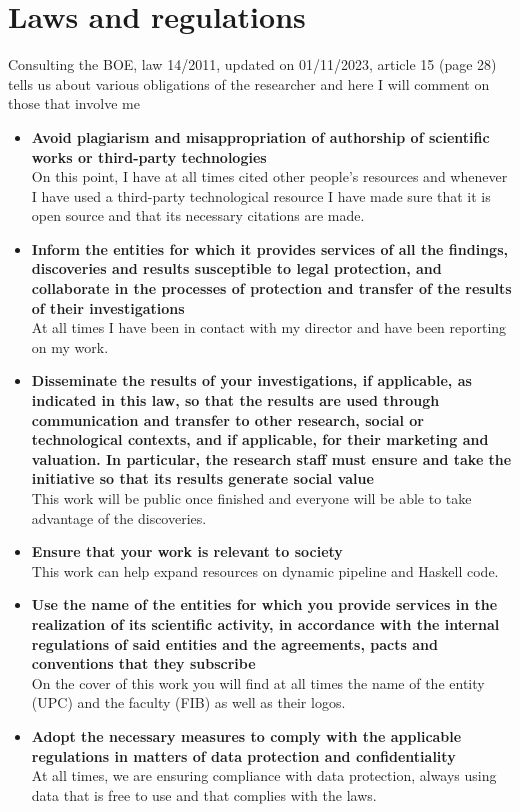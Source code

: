 \chapter{Laws and regulations}
Consulting the BOE, law 14/2011, updated on 01/11/2023, article 15 (page 28) tells us about various obligations of the researcher and here I will comment on those that involve me \cite{}
\begin{itemize}
    \item \textbf{Avoid plagiarism and misappropriation of authorship of scientific works or third-party technologies} \\
    On this point, I have at all times cited other people's resources and whenever I have used a third-party technological resource I have made sure that it is open source and that its necessary citations are made.
    \item \textbf{Inform the entities for which it provides services of all the findings, discoveries and results susceptible to legal protection, and collaborate in the processes of protection and transfer of the results of their investigations} \\
    At all times I have been in contact with my director and have been reporting on my work.
    \item \textbf{Disseminate the results of your investigations, if applicable, as indicated in this law, so that the results are used through communication and transfer to other research, social or technological contexts, and if applicable, for their marketing and valuation. In particular, the research staff must ensure and take the initiative so that its results generate social value} \\
    This work will be public once finished and everyone will be able to take advantage of the discoveries.
    \item \textbf{Ensure that your work is relevant to society} \\
    This work can help expand resources on dynamic pipeline and Haskell code.
    \item \textbf{Use the name of the entities for which you provide services in the realization of its scientific activity, in accordance with the internal regulations of said entities and the agreements, pacts and conventions that they subscribe} \\
    On the cover of this work you will find at all times the name of the entity (UPC) and the faculty (FIB) as well as their logos. 
    \item \textbf{Adopt the necessary measures to comply with the applicable regulations in matters of data protection and confidentiality} \\
    At all times, we are ensuring compliance with data protection, always using data that is free to use and that complies with the laws.
\end{itemize}